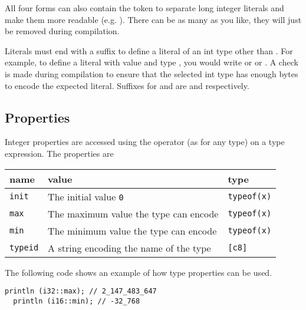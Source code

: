 All four forms can also contain the token \token{\_} to separate long integer
literals and make them more readable (e.g. ).
There can be as many \token{\_} as you like, they will just be removed during
compilation.

Literals must end with a suffix to define a literal of an int type other than
. For example, to define a literal with value  and type
, you would write  or  or
. A check is made during compilation to ensure that the selected
int type has enough bytes to encode the expected literal. Suffixes for
 and  are  and  respectively.

\subsection{Properties}
\label{sec:orgc02cb40}

Integer properties are accessed using the \token{::} operator (as for any type)
on a type expression. The properties are

\begin{center}
  \vspace{-3pt}
  \begin{adjustbox}{max width=\linewidth}
    \begin{tabular}{|l|ll|}
      \hline
      name & value & type\\[0pt]
      \hline
      \hline
      \texttt{init} & The initial value \texttt{0} & \texttt{typeof(x)}\\[0pt]
      \texttt{max} & The maximum value the type can encode & \texttt{typeof(x)}\\[0pt]
      \texttt{min} & The minimum value the type can encode & \texttt{typeof(x)}\\[0pt]
      \hline
      \texttt{typeid} & A string encoding the name of the type & \texttt{[c8]}\\[0pt]
      \hline
    \end{tabular}
  \end{adjustbox}
\end{center}

\smallskip

The following code shows an example of how type properties can be used.
\smallskip

\begin{lstlisting}[style=coloredverbatim]
  println (i32::max); // 2_147_483_647
  println (i16::min); // -32_768
\end{lstlisting}

